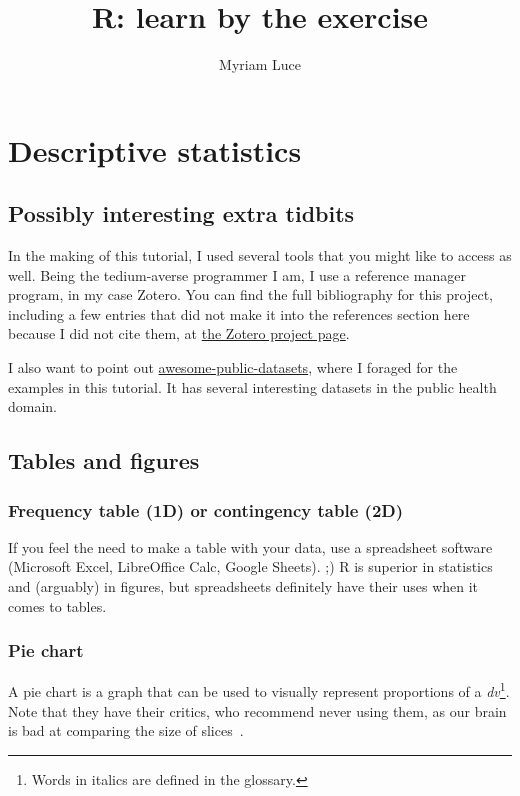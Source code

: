 \documentclass{report}
\author{Myriam Luce}
\title{R: learn by the exercise}
\begin{document}
\maketitle
\tableofcontents

\chapter{Descriptive statistics}
	\section{Possibly interesting extra tidbits}
In the making of this tutorial, I used several tools that you might like to access as well. Being the tedium-averse programmer I am, I use a reference manager program, in my case Zotero. You can find the full bibliography for this project, including a few entries that did not make it into the references section here because I did not cite them, at \href{https://www.zotero.org/groups/2223910/r_tutorial}{the Zotero project page}.

I also want to point out \href{https://github.com/awesomedata/awesome-public-datasets}{awesome-public-datasets}, where I foraged for the examples in this tutorial. It has several interesting datasets in the public health domain.

	\section{Tables and figures}
	\subsection{Frequency table (1D) or contingency table (2D)}
If you feel the need to make a table with your data, use a spreadsheet software (Microsoft Excel, LibreOffice Calc, Google Sheets).  ;) R is superior in statistics and (arguably) in figures, but spreadsheets definitely have their uses when it comes to tables.
	\subsection{Pie chart}
A pie chart is a graph that can be used to visually represent proportions of a \emph{\gls{dv}}\footnote{Words in italics are defined in the glossary.}. Note that they have their critics, who recommend never using them, as our brain is bad at comparing the size of slices~\cite{wiki_pie}.
\end{document}
